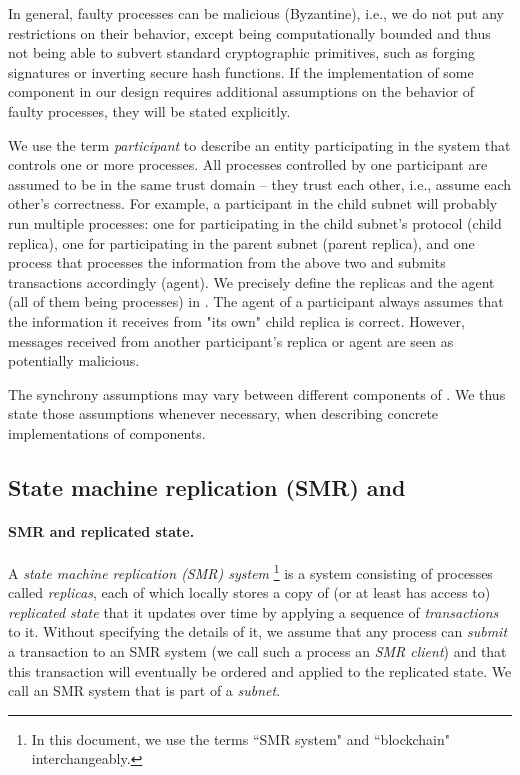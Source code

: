 In general, faulty processes can be malicious (Byzantine), i.e., we do not put any restrictions on their behavior, except being computationally bounded and thus not being able to subvert standard cryptographic primitives, such as forging signatures or inverting secure hash functions.
If the implementation of some component in our design requires additional assumptions on the behavior of faulty processes, they will be stated explicitly.

We use the term \emph{participant} to describe an entity participating in the system that controls one or more processes.
All processes controlled by one participant are assumed to be in the same trust domain -- they trust each other, i.e., assume each other's correctness.
For example, a participant in the child subnet will probably run multiple processes:
one for participating in the child subnet's protocol (child replica),
one for participating in the parent subnet (parent replica),
and one process that processes the information from the above two and submits transactions accordingly (\ipc agent).
We precisely define the replicas and the \ipc agent (all of them being processes) in .
The \ipc agent of a participant always assumes that the information it receives from "its own" child replica is correct.
However, messages received from another participant's replica or \ipc agent are seen as potentially malicious.

The synchrony assumptions may vary between different components of \ipc.
We thus state those assumptions whenever necessary, when describing concrete implementations of \ipc components.

\subsection{State machine replication (SMR) and \dapps}
\label{sec:smr}

\paragraph{SMR and replicated state.}
A \emph{state machine replication (SMR) system}%
\footnote{In this document, we use the terms ``SMR system" and ``blockchain" interchangeably.}
is a system consisting of processes called \emph{replicas}, each of which locally stores a copy of (or at least has access to) \emph{replicated state}
that it updates over time by applying a sequence of \emph{transactions} to it.
Without specifying the details of it, we assume that any process can \emph{submit} a transaction to an SMR system (we call such a process an \emph{SMR client})
and that this transaction will eventually be ordered and applied to the replicated state.
We call an SMR system that is part of \ipc a \emph{subnet}.

